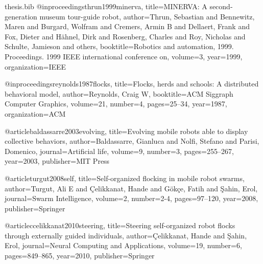 \documentclass[oneside, a4paper, 12pt]{memoir}
\begin{document}
\begin{filecontents}{thesis.bib}
@inproceedings{thrun1999minerva,
  title={MINERVA: A second-generation museum tour-guide robot},
  author={Thrun, Sebastian and Bennewitz, Maren and Burgard, Wolfram and Cremers, Armin B and Dellaert, Frank and Fox, Dieter and H{\"a}hnel, Dirk and Rosenberg, Charles and Roy, Nicholas and Schulte, Jamieson and others},
  booktitle={Robotics and automation, 1999. Proceedings. 1999 IEEE international conference on},
  volume={3},
  year={1999},
  organization={IEEE}
}

@inproceedings{reynolds1987flocks,
  title={Flocks, herds and schools: A distributed behavioral model},
  author={Reynolds, Craig W},
  booktitle={ACM Siggraph Computer Graphics},
  volume={21},
  number={4},
  pages={25--34},
  year={1987},
  organization={ACM}
}

@article{baldassarre2003evolving,
  title={Evolving mobile robots able to display collective behaviors},
  author={Baldassarre, Gianluca and Nolfi, Stefano and Parisi, Domenico},
  journal={Artificial life},
  volume={9},
  number={3},
  pages={255--267},
  year={2003},
  publisher={MIT Press}
}

@article{turgut2008self,
  title={Self-organized flocking in mobile robot swarms},
  author={Turgut, Ali E and {\c{C}}elikkanat, Hande and G{\"o}k{\c{c}}e, Fatih and {\c{S}}ahin, Erol},
  journal={Swarm Intelligence},
  volume={2},
  number={2-4},
  pages={97--120},
  year={2008},
  publisher={Springer}
}

@article{ccelikkanat2010steering,
  title={Steering self-organized robot flocks through externally guided individuals},
  author={{\c{C}}elikkanat, Hande and {\c{S}}ahin, Erol},
  journal={Neural Computing and Applications},
  volume={19},
  number={6},
  pages={849--865},
  year={2010},
  publisher={Springer}
}

\end{filecontents}



\end{document}
